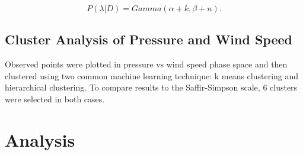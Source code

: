 \documentclass{article}
\begin{document}
		\begin{equation}
			P(\lambda | D) = Gamma(\alpha + k, \beta + n).
		\end{equation}
		

	\subsection{Cluster Analysis of Pressure and Wind Speed}
	Observed points were plotted in pressure vs wind speed phase space and then clustered using two common machine learning technique: k means clustering and hierarchical clustering. To compare results to the Saffir-Simpson scale\cite{}, 6 clusters were selected in both cases.

	\section{Analysis}

	
	
\end{document}
